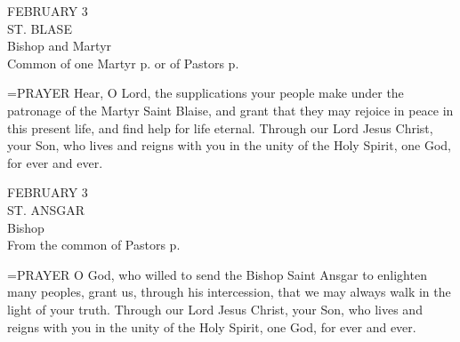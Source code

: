 \begin{center}\normalsize FEBRUARY 3\\
\footnotesize ST. BLASE\\
\footnotesize Bishop and Martyr\\
\footnotesize Common of one Martyr p.  or of Pastors p. \\
\end{center}

\hangindent=\parindent \small{PRAYER 
Hear, O Lord, the supplications your people make
under the patronage of the Martyr Saint Blaise,
and grant that they may rejoice in peace in this present life,
and find help for life eternal.
Through our Lord Jesus Christ, your Son,
who lives and reigns with you in the unity of the Holy Spirit,
one God, for ever and ever.\\}
 
\begin{center}\normalsize FEBRUARY 3\\
\footnotesize ST. ANSGAR\\
\footnotesize Bishop\\
\footnotesize From the common of Pastors p. \\
\end{center}

\hangindent=\parindent \small{PRAYER 
O God, who willed to send the Bishop Saint Ansgar
to enlighten many peoples,
grant us, through his intercession,
that we may always walk in the light of your truth.
Through our Lord Jesus Christ, your Son,
who lives and reigns with you in the unity of the Holy Spirit,
one God, for ever and ever.\\}
 
